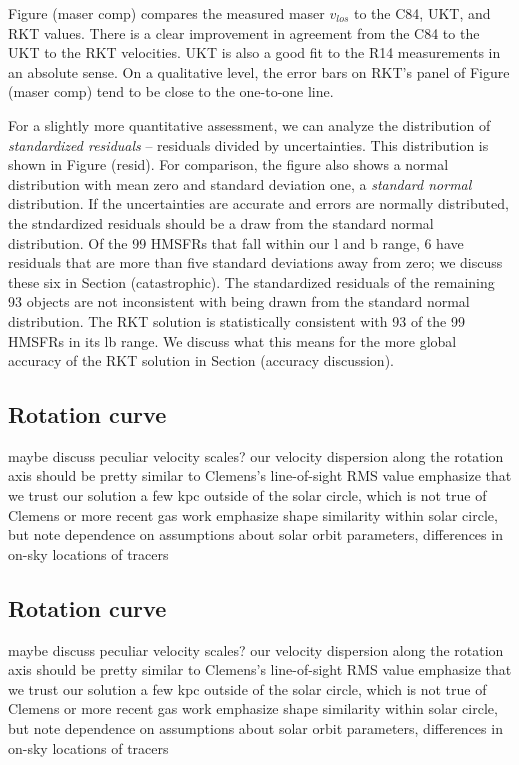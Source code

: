 Figure (maser comp) compares the measured maser $v_{los}$ to the C84, UKT, and  RKT values. There is a clear improvement in agreement from the C84 to the UKT to the RKT velocities. UKT is also a good fit to the R14 measurements in an absolute sense. On a qualitative level, the error bars on RKT's panel of Figure (maser comp) tend to be close to the one-to-one line. 

For a slightly more quantitative assessment, we can analyze the distribution of \emph{standardized residuals} -- residuals divided by uncertainties. This distribution is shown in Figure (resid). For comparison, the figure also shows a normal distribution with mean zero and standard deviation one, a \emph{standard normal} distribution. If the uncertainties are accurate and errors are normally distributed, the stndardized residuals should be a draw from the standard normal distribution. Of the 99 HMSFRs that fall within our l and b range, 6 have residuals that are more than five standard deviations away from zero; we discuss these six in Section (catastrophic). The standardized residuals of the remaining 93 objects are not inconsistent with being drawn from the standard normal distribution. The RKT solution is statistically consistent with 93 of the 99 HMSFRs in its lb range. We discuss what this means for the more global accuracy of the RKT solution in Section (accuracy discussion). 

\subsection{Rotation curve}
maybe discuss peculiar velocity scales? our velocity dispersion along the rotation axis should be pretty similar to Clemens’s line-of-sight RMS value emphasize that we trust our solution a few kpc outside of the solar circle, which is not true of Clemens or more recent gas work emphasize shape similarity within solar circle, but note dependence on assumptions about solar orbit parameters, differences in on-sky locations of tracers

\subsection{Rotation curve}
maybe discuss peculiar velocity scales? our velocity dispersion along the rotation axis should be pretty similar to Clemens’s line-of-sight RMS value emphasize that we trust our solution a few kpc outside of the solar circle, which is not true of Clemens or more recent gas work emphasize shape similarity within solar circle, but note dependence on assumptions about solar orbit parameters, differences in on-sky locations of tracers